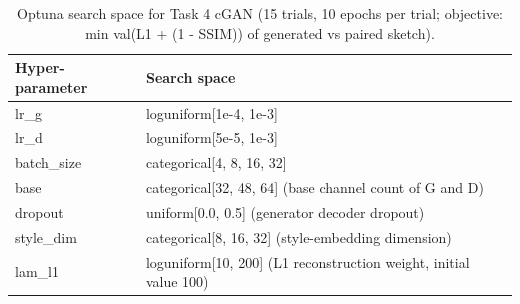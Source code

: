 \begin{table}[t]
\centering
\caption{Optuna search space for Task 4 cGAN (15 trials, 10 epochs per trial; objective: min val(L1 + (1 - SSIM)) of generated vs paired sketch).}
\label{tab:space_task4_cgan}
\footnotesize
\begin{tabular}{lp{5.6cm}}
\toprule
Hyper-parameter & Search space \\
\midrule
lr\_g & loguniform[1e-4, 1e-3] \\
lr\_d & loguniform[5e-5, 1e-3] \\
batch\_size & categorical[4, 8, 16, 32] \\
base & categorical[32, 48, 64]  (base channel count of G and D) \\
dropout & uniform[0.0, 0.5]  (generator decoder dropout) \\
style\_dim & categorical[8, 16, 32]  (style-embedding dimension) \\
lam\_l1 & loguniform[10, 200]  (L1 reconstruction weight, initial value 100) \\
\bottomrule
\end{tabular}
\end{table}
